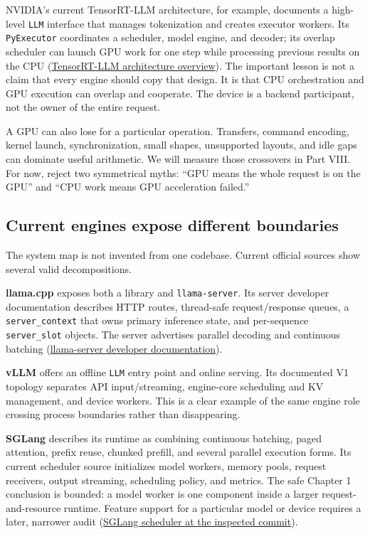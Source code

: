 \documentclass[
  10pt,
]{article}
\begin{document}
NVIDIA's current TensorRT-LLM architecture, for example, documents a
high-level \texttt{LLM} interface that manages tokenization and creates
executor workers. Its \texttt{PyExecutor} coordinates a scheduler, model
engine, and decoder; its overlap scheduler can launch GPU work for one
step while processing previous results on the CPU
(\href{https://nvidia.github.io/TensorRT-LLM/latest/developer-guide/overview.html}{TensorRT-LLM
architecture overview}). The important lesson is not a claim that every
engine should copy that design. It is that CPU orchestration and GPU
execution can overlap and cooperate. The device is a backend
participant, not the owner of the entire request.

A GPU can also lose for a particular operation. Transfers, command
encoding, kernel launch, synchronization, small shapes, unsupported
layouts, and idle gaps can dominate useful arithmetic. We will measure
those crossovers in Part VIII. For now, reject two symmetrical myths:
``GPU means the whole request is on the GPU'' and ``CPU work means GPU
acceleration failed.''

\subsection{Current engines expose different
boundaries}\label{current-engines-expose-different-boundaries}

The system map is not invented from one codebase. Current official
sources show several valid decompositions.

\textbf{llama.cpp} exposes both a library and \texttt{llama-server}. Its
server developer documentation describes HTTP routes, thread-safe
request/response queues, a \texttt{server\_context} that owns primary
inference state, and per-sequence \texttt{server\_slot} objects. The
server advertises parallel decoding and continuous batching
(\href{https://github.com/ggml-org/llama.cpp/blob/3466812d1f06728effe7c0f3c0671117f461672d/tools/server/README-dev.md}{llama-server
developer documentation}).

\textbf{vLLM} offers an offline \texttt{LLM} entry point and online
serving. Its documented V1 topology separates API input/streaming,
engine-core scheduling and KV management, and device workers. This is a
clear example of the same engine role crossing process boundaries rather
than disappearing.

\textbf{SGLang} describes its runtime as combining continuous batching,
paged attention, prefix reuse, chunked prefill, and several parallel
execution forms. Its current scheduler source initializes model workers,
memory pools, request receivers, output streaming, scheduling policy,
and metrics. The safe Chapter 1 conclusion is bounded: a model worker is
one component inside a larger request-and-resource runtime. Feature
support for a particular model or device requires a later, narrower
audit
(\href{https://github.com/sgl-project/sglang/blob/221a6273ce3212c79483df233b4511fdf8fbe6d0/python/sglang/srt/managers/scheduler.py}{SGLang
scheduler at the inspected commit}).
\end{document}
